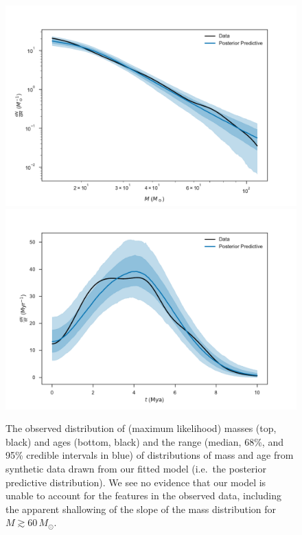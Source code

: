 \documentclass[apjl]{emulateapj}
\newcommand{\MSun}{M_\odot}
\begin{document}
\begin{figure}
    		    		\includegraphics[width=\columnwidth]{dNdm-ppc-band.pdf}\\
                \includegraphics[width=\columnwidth]{dNdt-ppc-band.pdf}
    		\caption{The observed distribution of (maximum likelihood) masses (top, black) and ages (bottom, black) and the range (median, 68\%, and 95\% credible intervals in blue) of distributions of mass and age from synthetic data drawn from our fitted model (i.e.\ the posterior predictive distribution).  We see no evidence that our model is unable to account for the features in the observed data, including the apparent shallowing of the slope of the mass distribution for $M \gtrsim 60 \, \MSun$.}\label{fig:PPC}
\end{figure}
\end{document}
